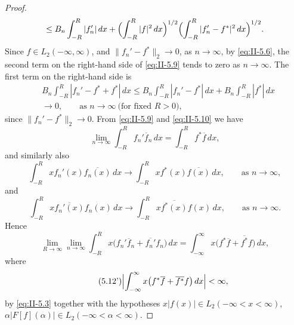\begin{proof}
\begin{equation}
\le B_{n}\int_{-R}^{R}|f_{n}'|\,dx
+\Bigl(\int_{-R}^{R}|f|^{2}\,dx\Bigr)^{1/2}
\Bigl(\int_{-R}^{R}|f_{n}'-f^{*}|^{2}\,dx\Bigr)^{1/2}.
\end{equation}
Since $f\in L_{2}(-\infty,\infty)$, and $\|f_{n}'-f^{*}\|_{2}\to 0$, as $n\to\infty$, by \eqref{eq:II-5.6}, the second term on the right-hand side of \eqref{eq:II-5.9} tends to zero as $n\to\infty$. The first term on the right-hand side is
\begin{equation}\tag{5.10}\label{eq:II-5.10}
\begin{aligned}
&B_{n}\int_{-R}^{R}|f_{n}'-f^{*}+f^{*}|\,dx
\le B_{n}\int_{-R}^{R}|f_{n}'-f^{*}|\,dx+B_{n}\int_{-R}^{R}|f^{*}|\,dx\\
&\to 0,\qquad\text{as }n\to\infty\ \text{(for fixed }R>0),
\end{aligned}
\end{equation}
since $\|f_{n}'-f^{*}\|_{2}\to 0$. From \eqref{eq:II-5.9} and \eqref{eq:II-5.10} we have
\begin{equation}\tag{5.11}\label{eq:II-5.11}
\lim_{n\to\infty}\int_{-R}^{R}f_{n}'\overline{f}_{n}\,dx
=\int_{-R}^{R}f^{*}\overline{f}\,dx,
\end{equation}
and similarly also
\[
\int_{-R}^{R}x f_{n}'(x)\overline{f_{n}(x)}\,dx\to\int_{-R}^{R}x f^{*}(x)\overline{f(x)}\,dx,\qquad\text{as }n\to\infty,
\]
and
\[
\int_{-R}^{R}x\overline{f_{n}'(x)}f_{n}(x)\,dx\to\int_{-R}^{R}x\overline{f^{*}(x)}f(x)\,dx,\qquad\text{as }n\to\infty.
\]
Hence
\begin{equation}\tag{5.12}\label{eq:II-5.12}
\lim_{R\to\infty}\lim_{n\to\infty}\int_{-R}^{R}x\bigl(f_{n}'\overline{f}_{n}+\overline{f_{n}'}f_{n}\bigr)\,dx
=\int_{-\infty}^{\infty}x\bigl(f^{*}\overline{f}+\overline{f^{*}}f\bigr)\,dx,
\end{equation}
where
\begin{equation}\tag{5.12'}\label{eq:II-5.12p}
\Bigl|\int_{-\infty}^{\infty}x\bigl(f^{*}\overline{f}+\overline{f^{*}}f\bigr)\,dx\Bigr|<\infty,
\end{equation}
by \eqref{eq:II-5.3} together with the hypotheses $x|f(x)|\in L_{2}(-\infty<x<\infty)$, $\alpha|F[f](\alpha)|\in L_{2}(-\infty<\alpha<\infty)$.


\end{proof}
